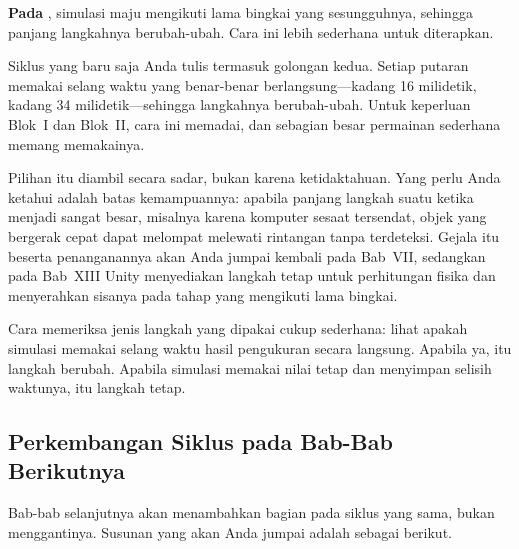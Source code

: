 \textbf{Pada }, simulasi maju mengikuti lama bingkai
yang sesungguhnya, sehingga panjang langkahnya berubah-ubah. Cara ini lebih
sederhana untuk diterapkan.

Siklus yang baru saja Anda tulis termasuk golongan kedua. Setiap putaran
memakai selang waktu yang benar-benar berlangsung---kadang 16 milidetik,
kadang 34 milidetik---sehingga langkahnya berubah-ubah. Untuk keperluan Blok~I
dan Blok~II, cara ini memadai, dan sebagian besar permainan sederhana memang
memakainya.

Pilihan itu diambil secara sadar, bukan karena ketidaktahuan. Yang perlu Anda
ketahui adalah batas kemampuannya: apabila panjang langkah suatu ketika
menjadi sangat besar, misalnya karena komputer sesaat tersendat, objek yang
bergerak cepat dapat melompat melewati rintangan tanpa terdeteksi. Gejala
itu beserta penanganannya akan Anda jumpai kembali pada Bab~VII, sedangkan
pada Bab~XIII Unity menyediakan langkah tetap untuk perhitungan fisika dan
menyerahkan sisanya pada tahap yang mengikuti lama bingkai.

\begin{catatabox}
Cara memeriksa jenis langkah yang dipakai cukup sederhana: lihat apakah
simulasi memakai selang waktu hasil pengukuran secara langsung. Apabila ya,
itu langkah berubah. Apabila simulasi memakai nilai tetap dan menyimpan
selisih waktunya, itu langkah tetap.
\end{catatabox}

\subsection{Perkembangan Siklus pada Bab-Bab Berikutnya}

Bab-bab selanjutnya akan menambahkan bagian pada siklus yang sama, bukan
menggantinya. Susunan yang akan Anda jumpai adalah sebagai berikut.

